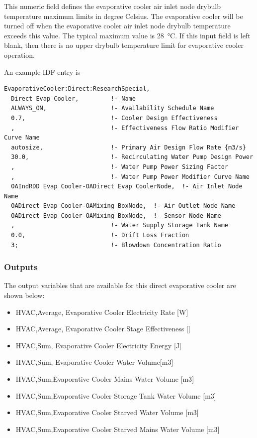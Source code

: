 This numeric field defines the evaporative cooler air inlet node drybulb temperature maximum limits in degree Celsius. The evaporative cooler will be turned off when the evaporative cooler air inlet node drybulb temperature exceeds this value. The typical maximum value is \SI{28}{\celsius}. If this input field is left blank, then there is no upper drybulb temperature limit for evaporative cooler operation.

An example IDF entry is

\begin{lstlisting}
EvaporativeCooler:Direct:ResearchSpecial,
  Direct Evap Cooler,         !- Name
  ALWAYS_ON,                  !- Availability Schedule Name
  0.7,                        !- Cooler Design Effectiveness
  ,                           !- Effectiveness Flow Ratio Modifier Curve Name
  autosize,                   !- Primary Air Design Flow Rate {m3/s}
  30.0,                       !- Recirculating Water Pump Design Power
  ,                           !- Water Pump Power Sizing Factor
  ,                           !- Water Pump Power Modifier Curve Name
  OAIndRDD Evap Cooler-OADirect Evap CoolerNode,  !- Air Inlet Node Name
  OADirect Evap Cooler-OAMixing BoxNode,  !- Air Outlet Node Name
  OADirect Evap Cooler-OAMixing BoxNode,  !- Sensor Node Name
  ,                           !- Water Supply Storage Tank Name
  0.0,                        !- Drift Loss Fraction
  3;                          !- Blowdown Concentration Ratio
\end{lstlisting}

\subsubsection{Outputs}\label{outputs-1-009}

The output variables that are available for this direct evaporative cooler are shown below:

\begin{itemize}
\item
  HVAC,Average, Evaporative Cooler Electricity Rate {[}W{]}
\item
  HVAC,Average, Evaporative Cooler Stage Effectiveness {[]}
\item
  HVAC,Sum, Evaporative Cooler Electricity Energy {[}J{]}
\item
  HVAC,Sum, Evaporative Cooler Water Volume{[}m3{]}
\item
  HVAC,Sum,Evaporative Cooler Mains Water Volume {[}m3{]}
\item
  HVAC,Sum,Evaporative Cooler Storage Tank Water Volume {[}m3{]}
\item
  HVAC,Sum,Evaporative Cooler Starved Water Volume {[}m3{]}
\item
  HVAC,Sum,Evaporative Cooler Starved Mains Water Volume {[}m3{]}
\end{itemize}

